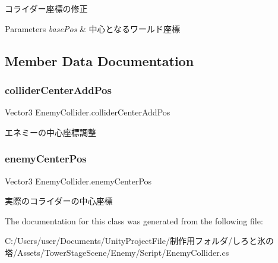 コライダー座標の修正 


\begin{DoxyParams}{Parameters}
{\em base\+Pos} & 中心となるワールド座標\\
\hline
\end{DoxyParams}


\subsection{Member Data Documentation}
\mbox{\label{class_enemy_collider_a8dcf6577b63427f93bde06c22b9fffcf}} 
\subsubsection{\texorpdfstring{collider\+Center\+Add\+Pos}{colliderCenterAddPos}}
{\footnotesize\ttfamily Vector3 Enemy\+Collider.\+collider\+Center\+Add\+Pos\hspace{0.3cm}{\ttfamily [private]}}



エネミーの中心座標調整 

\mbox{\label{class_enemy_collider_a3e048a434677711efec8d3951381f2e2}} 
\subsubsection{\texorpdfstring{enemy\+Center\+Pos}{enemyCenterPos}}
{\footnotesize\ttfamily Vector3 Enemy\+Collider.\+enemy\+Center\+Pos}



実際のコライダーの中心座標 



The documentation for this class was generated from the following file\+:\begin{DoxyCompactItemize}
\item 
C\+:/\+Users/user/\+Documents/\+Unity\+Project\+File/制作用フォルダ/しろと氷の塔/\+Assets/\+Tower\+Stage\+Scene/\+Enemy/\+Script/Enemy\+Collider.\+cs\end{DoxyCompactItemize}
